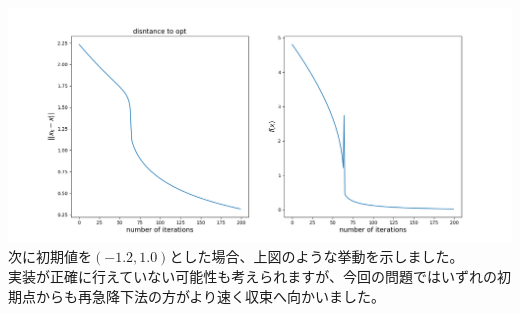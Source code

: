 \documentclass[uplatex,dvipdfmx]{jsarticle}
\begin{document}
  \includegraphics[scale=0.4]{out/newton2.png}
  次に初期値を$(-1.2, 1.0)$とした場合、上図のような挙動を示しました。\\
  実装が正確に行えていない可能性も考えられますが、今回の問題ではいずれの初期点からも再急降下法の方がより速く収束へ向かいました。
\end{document}
